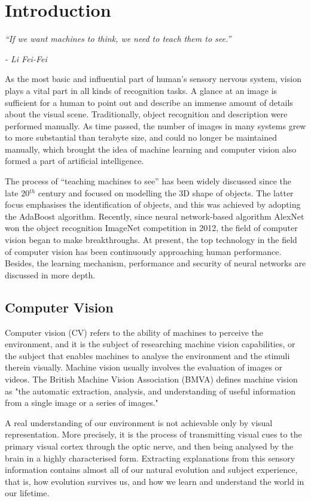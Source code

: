 \chapter{Introduction}
\label{cha:intro}

\epigraph{\textit{``If we want machines to think, we need to teach them to see.''}}{\textit{- Li Fei-Fei}}


As the most basic and influential part of human's sensory nervous system, vision plays a vital part in all kinds of recognition tasks. A glance at an image is sufficient for a human to point out and describe an immense amount of details about the visual scene. Traditionally, object recognition and description were performed manually. As time passed, the number of images in many systems grew to more substantial than terabyte size, and could no longer be maintained manually, which brought the idea of machine learning and computer vision also formed a part of artificial intelligence. 

The process of ``teaching machines to see'' has been widely discussed since the late 20$^{th}$ century and focused on modelling the 3D shape of objects. The latter focus emphasises the identification of objects, and this was achieved by adopting the AdaBoost \cite{adaboost} algorithm. Recently, since neural network-based algorithm AlexNet \cite{alexnet} won the object recognition ImageNet \cite{imagenet} competition in 2012, the field of computer vision began to make breakthroughs. At present, the top technology in the field of computer vision has been continuously approaching human performance. Besides, the learning mechanism, performance and security of neural networks are discussed in more depth.

\section{Computer Vision}

Computer vision (CV) refers to the ability of machines to perceive the environment, and it is the subject of researching machine vision capabilities, or the subject that enables machines to analyse the environment and the stimuli therein visually. Machine vision usually involves the evaluation of images or videos. The British Machine Vision Association (BMVA) defines machine vision as "the automatic extraction, analysis, and understanding of useful information from a single image or a series of images." \cite{bmva}

A real understanding of our environment is not achievable only by visual representation. More precisely, it is the process of transmitting visual cues to the primary visual cortex through the optic nerve, and then being analysed by the brain in a highly characterised form. Extracting explanations from this sensory information contains almost all of our natural evolution and subject experience, that is, how evolution survives us, and how we learn and understand the world in our lifetime.


